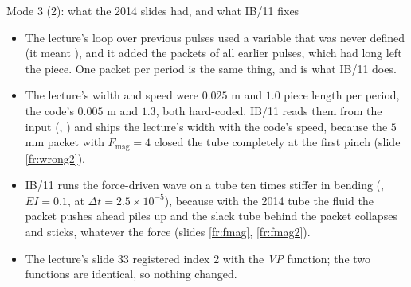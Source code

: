 \documentclass[aspectratio=169,11pt]{beamer}
\begin{document}
\begin{frame}{Mode 3 (2): what the 2014 slides had, and what IB/11 fixes}
\label{fr:forceperi2}
\footnotesize
\begin{itemize}
  \item {} The lecture's loop over previous pulses used a variable  that was never defined (it meant ), and it added the packets of all earlier pulses, which had long left the piece. One packet per period is the same thing, and is what IB/11 does.
  \item {} The lecture's width and speed were $0.025$ m and $1.0$ piece length per period, the code's $0.005$ m and $1.3$, both hard-coded. IB/11 reads them from the input (, ) and ships the lecture's width with the code's speed, because the $5$ mm packet with $F_{\mathrm{mag}} = 4$ closed the tube completely at the first pinch (slide \ref{fr:wrong2}).
  \item {} IB/11 runs the force-driven wave on a tube ten times stiffer in bending (, $EI = 0.1$, at $\Delta t = 2.5\times10^{-5}$), because with the 2014 tube the fluid the packet pushes ahead piles up and the slack tube behind the packet collapses and sticks, whatever the force (slides \ref{fr:fmag}, \ref{fr:fmag2}).
  \item {} The lecture's slide 33 registered index 2 with the \emph{VP} function; the two functions are identical, so nothing changed.
\end{itemize}
\end{frame}
\end{document}
